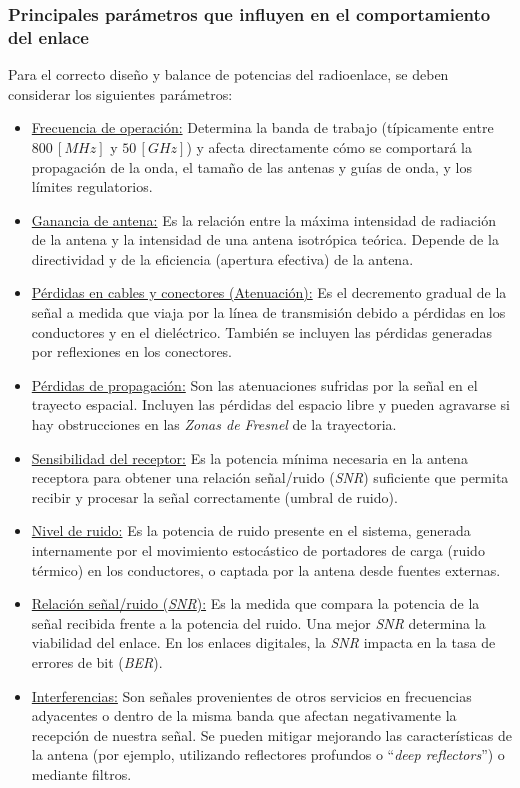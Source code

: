 \subsubsection{Principales parámetros que influyen en el comportamiento del enlace}
\label{sec_2.1.2}
Para el correcto diseño y balance de potencias del radioenlace, se deben considerar los siguientes parámetros:
\begin{itemize}
    \item \underline{Frecuencia de operación:} Determina la banda de trabajo (típicamente entre $800 \, [MHz]$ y $50 \, [GHz]$) y afecta directamente cómo se comportará la propagación de la onda, el tamaño de las antenas y guías de onda, y los límites regulatorios.
    \item \underline{Ganancia de antena:} Es la relación entre la máxima intensidad de radiación de la antena y la intensidad de una antena isotrópica teórica. Depende de la directividad y de la eficiencia (apertura efectiva) de la antena.
    \item \underline{Pérdidas en cables y conectores (Atenuación):} Es el decremento gradual de la señal a medida que viaja por la línea de transmisión debido a pérdidas en los conductores y en el dieléctrico. También se incluyen las pérdidas generadas por reflexiones en los conectores.
    \item \underline{Pérdidas de propagación:} Son las atenuaciones sufridas por la señal en el trayecto espacial. Incluyen las pérdidas del espacio libre y pueden agravarse si hay obstrucciones en las \textit{Zonas de Fresnel} de la trayectoria.
    \item \underline{Sensibilidad del receptor:} Es la potencia mínima necesaria en la antena receptora para obtener una relación señal/ruido (\textit{SNR}) suficiente que permita recibir y procesar la señal correctamente (umbral de ruido).
    \item \underline{Nivel de ruido:} Es la potencia de ruido presente en el sistema, generada internamente por el movimiento estocástico de portadores de carga (ruido térmico) en los conductores, o captada por la antena desde fuentes externas.
    \item \underline{Relación señal/ruido (\textit{SNR}):} Es la medida que compara la potencia de la señal recibida frente a la potencia del ruido. Una mejor \textit{SNR} determina la viabilidad del enlace. En los enlaces digitales, la \textit{SNR} impacta en la tasa de errores de bit (\textit{BER}).
    \item \underline{Interferencias:} Son señales provenientes de otros servicios en frecuencias adyacentes o dentro de la misma banda que afectan negativamente la recepción de nuestra señal. Se pueden mitigar mejorando las características de la antena (por ejemplo, utilizando reflectores profundos o ``\textit{deep reflectors}'') o mediante filtros.

\end{itemize}

